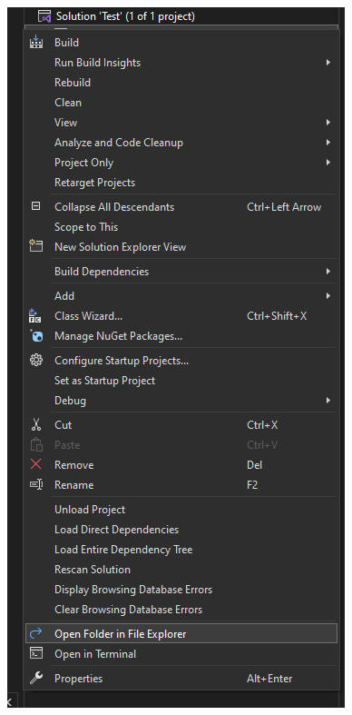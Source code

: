 \documentclass[../ro-fa-lab.tex]{subfiles}
\begin{document}
\includegraphics[width=\textwidth,alt={A screenshot of a computer Description automatically generated}]{./Resources/tutorial_lab9/image2.png}
\end{document}
